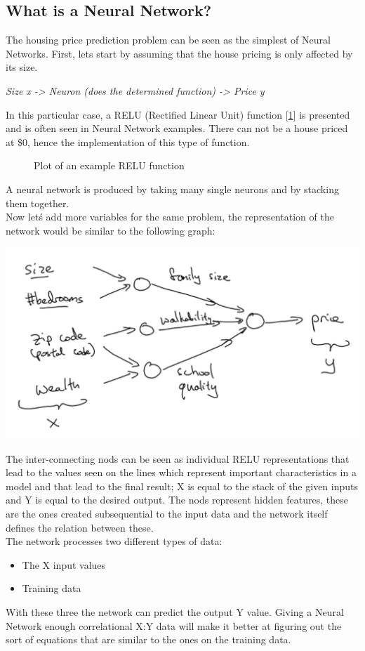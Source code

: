 \documentclass[11pt]{report}
\begin{document}
\subsection*{What is a Neural Network?}
The housing price prediction problem can be seen as the simplest of Neural Networks. First, lets start by assuming that the house pricing is only affected by its size.
\begin{center}
	\textit{Size x -> Neuron (does the determined function) -> Price y}
\end{center}
In this particular case, a RELU (Rectified Linear Unit) function [\ref{fig:F1}] is presented and is often seen in Neural Network examples. There can not be a house priced at \$0, hence the implementation of this type of function.
\begin{figure}
	\centering
	\caption{Plot of an example RELU function} \label{fig:F1}
\end{figure}
A neural network is produced by taking many single neurons and by stacking them together. \\
Now let\'s add more variables for the same problem, the representation of the network would be similar to the following graph:
\begin{center}
	\includegraphics[width = .50\textwidth]{HPP.png}
\end{center}
The inter-connecting nods can be seen as individual RELU representations that lead to the values seen on the lines which represent important characteristics in a model and that lead to the final result; X is equal to the stack of the given inputs and Y is equal to the desired output. The  nods represent hidden features, these are the ones created subsequential to the input data and the network itself defines the relation between these.\\
The network processes two different types of data:
\begin{itemize}
	\item The X input values
	\item Training data
\end{itemize}
With these three the network can predict the output Y value. Giving a Neural Network enough correlational X:Y data will make it better at figuring out the sort of equations that are similar to the ones on the training data.
\end{document}
